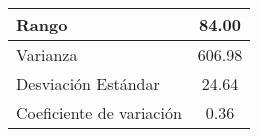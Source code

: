 \begin{footnotesize}
\begin{minipage}[ht]{0.4\textwidth}
\begin{tabular}{lc}
            \midrule
            Rango & 84.00 \\
            \midrule
            Varianza & 606.98 \\
            \midrule
            Desviación Estándar & 24.64 \\
            \midrule
            Coeficiente de variación & 0.36 \\
            \bottomrule
        \end{tabular}
        \label{tab:variableContinuaMedidasDispersion}
    \end{minipage}
\end{footnotesize}